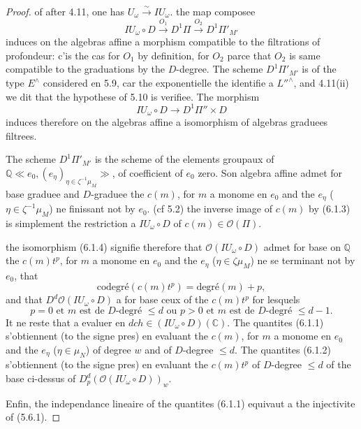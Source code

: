 \documentclass[11pt,a4paper]{article}
\theoremstyle{plain}
\theoremstyle{definition}
\newcommand{\dch}{\mathit{dch}}
\newcommand{\Q}{\mathbb{Q}}
\newcommand{\C}{\mathbb{C}}
\begin{document}
\begin{proof}
of after 4.11, one has $U_\omega \xrightarrow{\sim} IU_\omega$. the map composee
\begin{equation}\label{eq:6.1.3}
IU_\omega \circ D \xrightarrow{O_1} D^1\Pi \xrightarrow{O_2} D^1\Pi'_{M'}
\end{equation}
induces on the algebras affine a morphism compatible to the filtrations of profondeur: c'is the cas for $O_1$ by definition, for $O_2$ parce that $O_2$ is same compatible to the graduations by the $D$-degree. The scheme $D^1\Pi'_{M'}$ is of the type $E^{\wedge}$ considered en 5.9, car the exponentielle the identifie a $L''^{\wedge}$, and 4.11(ii) we dit that the hypothese of 5.10 is verifiee. The morphism
\begin{equation}\label{eq:6.1.4}
IU_\omega \circ D \to D^1\Pi'' \times D
\end{equation}
induces therefore on the algebras affine a isomorphism of algebras graduees filtrees.

The scheme $D^1\Pi'_{M'}$ is the scheme of the elements groupaux of $\Q \ll e_0, (e_\eta)_{\eta \in \zeta^{-1}\mu_M} \gg$, of coefficient of $e_0$ zero. Son algebra affine admet for base graduee and $D$-graduee the $c(m)$, for $m$ a monome en $e_0$ and the $e_\eta$ ($\eta \in \zeta^{-1}\mu_M$) ne finissant not by $e_0$. (cf 5.2) the inverse image of $c(m)$ by (6.1.3) is simplement the restriction a $IU_\omega \circ D$ of $c(m) \in \mathcal{O}(\Pi)$.

the isomorphism (6.1.4) signifie therefore that $\mathcal{O}(IU_\omega \circ D)$ admet for base on $\Q$ the $c(m)t^p$, for $m$ a monome en $e_0$ and the $e_\eta$ ($\eta \in \zeta \mu_M$) ne se terminant not by $e_0$, that
\[
\text{codegr\'e}(c(m)t^p) = \text{degr\'e}(m) + p,
\]
and that $D^d \mathcal{O}(IU_\omega \circ D)$ a for base ceux of the $c(m)t^p$ for lesquels
\[
p=0 \text{ et } m \text{ est de } D\text{-degr\'e } \leq d \text{ ou } p > 0 \text{ et } m \text{ est de } D\text{-degr\'e } \leq d-1.
\]
It ne reste that a evaluer en $\dch \in (IU_\omega \circ D)(\C)$. The quantites (6.1.1) s'obtiennent (to the signe pres) en evaluant the $c(m)$, for $m$ a monome en $e_0$ and the $e_\eta$ ($\eta \in \mu_N$) of degree $w$ and of $D$-degree $\leq d$. The quantites (6.1.2) s'obtiennent (to the signe pres) en evaluant the $c(m)t^p$ of $D$-degree $\leq d$ of the base ci-dessus of $D^d_p(\mathcal{O}(IU_\omega \circ D))_w$.

Enfin, the independance lineaire of the quantites (6.1.1) equivaut a the injectivite of (5.6.1).
\end{proof}
\end{document}
